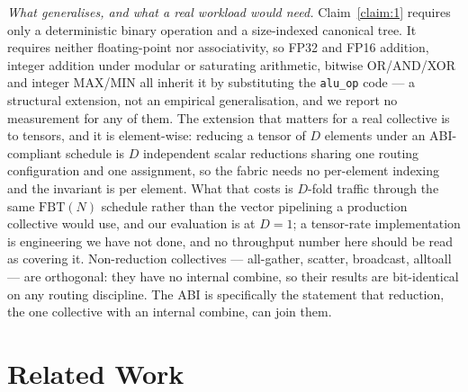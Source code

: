 \documentclass[journal,10pt]{IEEEtran}
\theoremstyle{plain}
\theoremstyle{definition}
\theoremstyle{remark}
\newcommand{\FBT}{\ensuremath{\mathrm{FBT}}}
\newcommand{\sv}[1]{\texttt{#1}}
\begin{document}
\emph{What generalises, and what a real workload would need.}
Claim~\ref{claim:1} requires only a deterministic binary operation and a
size-indexed canonical tree. It requires neither floating-point nor associativity, so FP32 and FP16
addition, integer addition under modular or saturating arithmetic, bitwise
OR/AND/XOR and integer MAX/MIN all inherit it by substituting the
\sv{alu\_op} code --- a structural extension, not an empirical generalisation,
and we report no measurement for any of them. The extension that matters for a real collective
is to tensors, and it is element-wise: reducing a tensor of $D$ elements
under an ABI-compliant schedule is $D$ independent scalar reductions sharing
one routing configuration and one assignment, so the fabric needs no
per-element indexing and the invariant is per element. What that costs is
$D$-fold traffic through the same $\FBT(N)$ schedule rather than the vector
pipelining a production collective would use, and our evaluation is at
$D = 1$; a tensor-rate implementation is engineering we have not done, and no
throughput number here should be read as covering it. Non-reduction
collectives --- all-gather, scatter, broadcast, alltoall --- are orthogonal:
they have no internal combine, so their results are bit-identical on any
routing discipline. The ABI is specifically the statement that reduction,
the one collective with an internal combine, can join them.


\section{Related Work}\label{sec:related}
\end{document}
